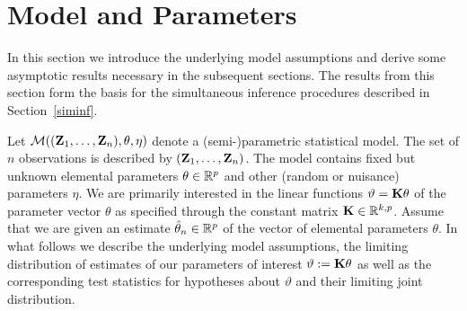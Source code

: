 \documentclass[12pt,a4paper]{article}
\begin{document}
\section{Model and Parameters}

\label{model}

In this section we introduce the underlying model assumptions and derive
some asymptotic results necessary in the subsequent sections. The results
from this section form the basis for the simultaneous inference procedures
described in Section~\ref{siminf}.

Let $\mathcal{M}((\mathbf{Z}_1, \dots, \mathbf{Z}_n), \theta, \eta)$ denote a (semi-)parametric statistical
model. The set of $n$ observations is described by $(\mathbf{Z}_1, \dots, \mathbf{Z}_n)$. 
The model contains fixed but unknown elemental parameters $\theta
\in \mathbb{R}^p$ and other (random or nuisance) parameters $\eta$. We are
primarily interested in the linear functions $\vartheta = \mathbf{K} \theta$ of the parameter vector 
$\theta$ as specified through the constant matrix $\mathbf{K} \in \mathbb{R}^{k, p}$.
Assume that we are given an estimate $\hat{\theta}_n \in \mathbb{R}^p$ of the
vector of elemental parameters $\theta$. In what follows we describe the underlying
model assumptions, the limiting distribution of estimates of our parameters of 
interest $\vartheta := \mathbf{K} \theta$ as well
as the corresponding test statistics for hypotheses about $\vartheta$ 
and their limiting joint distribution.
\end{document}
